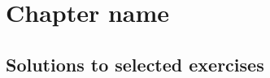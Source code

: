 \documentclass[../book/calcnotes.tex]{subfiles}
\begin{document}
\chapter{Chapter name}
\label{ch:template}

\section{Solutions to selected exercises}
\label{sec:template.solns}
\printsolutions[chapter]
\end{document}
